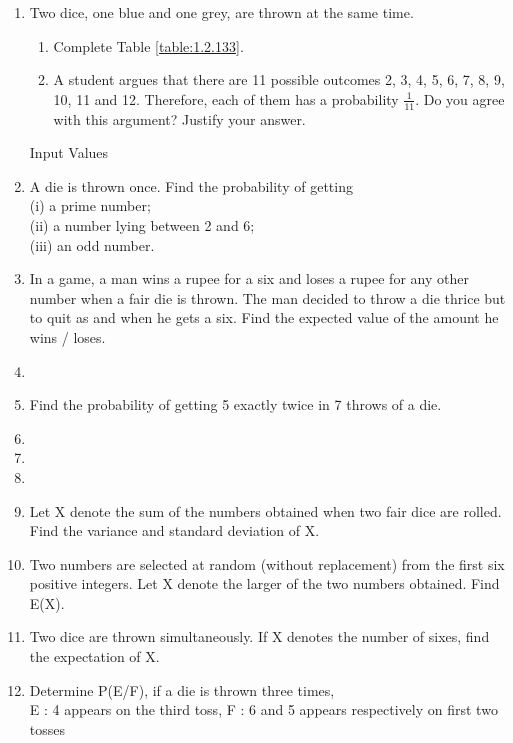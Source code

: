 \renewcommand{\theequation}{\theenumi}
\begin{enumerate}[label=\thesection.\arabic*.,ref=\thesection.\theenumi]


\item Two dice, one blue and one grey, are thrown at the same time.  
\begin{enumerate}
\item  Complete Table \ref{table:1.2.133}.
\item  A student argues that there are 11 possible outcomes 2, 3, 4, 5, 6, 7, 8, 9, 10, 11 and 12. Therefore, each of them has a probability $\frac{1}{11}$. Do you agree with this argument? Justify your answer.
\end{enumerate}
%
\begin{table}[ht!]
\centering

\caption{Input Values}
\label{table:1.2.133}	
\end{table}
\item A die is thrown once. Find the probability of getting\\
(i) a prime number;\\
(ii) a number lying between 2 and 6;\\
(iii) an odd number.
\\
\solution

\item In a game, a man wins a rupee for a six and loses a rupee for any other number when a fair die is thrown. The man decided to throw a die thrice but to quit as and when he gets a six. Find the expected value of the amount he wins / loses.\\
\item 
\item Find the probability of getting 5 exactly twice in 7 throws of a die.\\
\item 

\item
\item 
\item Let X denote the sum of the numbers obtained when two fair dice are rolled. Find the variance and standard deviation of X.\\
\item Two numbers are selected at random (without replacement) from the first six positive integers. Let X denote the larger of the two numbers obtained. Find E(X).\\
%
\solution

\item Two dice are thrown simultaneously. If X denotes the number of sixes, find the
expectation of X.\\
\item Determine P(E/F), if a die is thrown three times,\\
E : 4 appears on the third toss, F : 6 and 5 appears respectively on first two tosses\\


\end{enumerate}
